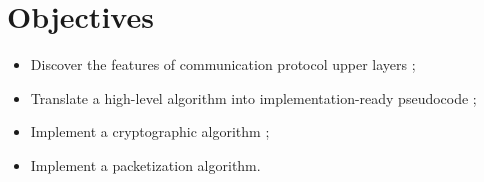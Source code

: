 \section*{Objectives}

\begin{itemize}
    \item Discover the features of communication protocol upper layers ;
    \item Translate a high-level algorithm into implementation-ready pseudocode ;
    \item Implement a cryptographic algorithm ;
    \item Implement a packetization algorithm.
\end{itemize}

